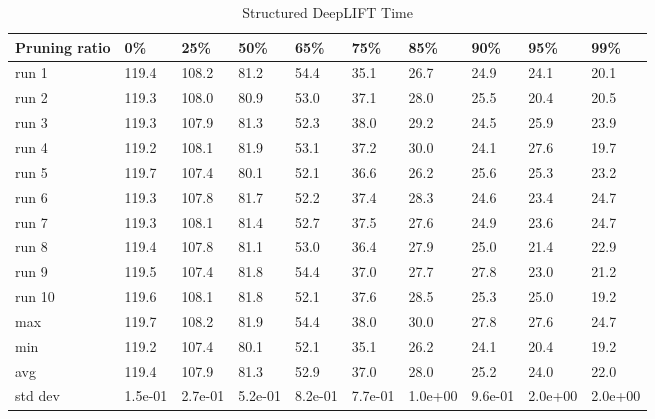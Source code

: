 \documentclass[journal,onecolumn,12pt]{IEEEtran}
\begin{document}
\begin{table}[htbp]
    \caption{Structured DeepLIFT Time}
    \begin{center}
    \begin{tabular}{ |p{2cm}|p{1cm}|p{1cm}|p{1cm}|p{1cm}|p{1cm}|p{1cm}|p{1cm}|p{1cm}|p{1cm}|  }
     \hline
     Pruning ratio  & 0\% & 25\%& 50\%& 65\%& 75\%& 85\%& 90\%& 95\%& 99\%\\
     \hline
     run 1&119.4&108.2&81.2&54.4&35.1&26.7&24.9&24.1&20.1\\
     run 2&119.3&108.0&80.9&53.0&37.1&28.0&25.5&20.4&20.5\\
     run 3&119.3&107.9&81.3&52.3&38.0&29.2&24.5&25.9&23.9\\
     run 4&119.2&108.1&81.9&53.1&37.2&30.0&24.1&27.6&19.7\\
     run 5&119.7&107.4&80.1&52.1&36.6&26.2&25.6&25.3&23.2\\
     run 6&119.3&107.8&81.7&52.2&37.4&28.3&24.6&23.4&24.7\\
     run 7&119.3&108.1&81.4&52.7&37.5&27.6&24.9&23.6&24.7\\
     run 8&119.4&107.8&81.1&53.0&36.4&27.9&25.0&21.4&22.9\\
     run 9&119.5&107.4&81.8&54.4&37.0&27.7&27.8&23.0&21.2\\
     run 10&119.6&108.1&81.8&52.1&37.6&28.5&25.3&25.0&19.2\\
     \hline
        max     &119.7&108.2&81.9&54.4&38.0&30.0&27.8&27.6&24.7\\
        min     &119.2&107.4&80.1&52.1&35.1&26.2&24.1&20.4&19.2\\
        avg     &119.4&107.9&81.3&52.9&37.0&28.0&25.2&24.0&22.0\\
        std dev &1.5e-01&2.7e-01&5.2e-01&8.2e-01&7.7e-01&1.0e+00&9.6e-01&2.0e+00&2.0e+00\\
     \hline
    \end{tabular}
    \end{center}
    \label{tab:a8}
\end{table}
\end{document}

